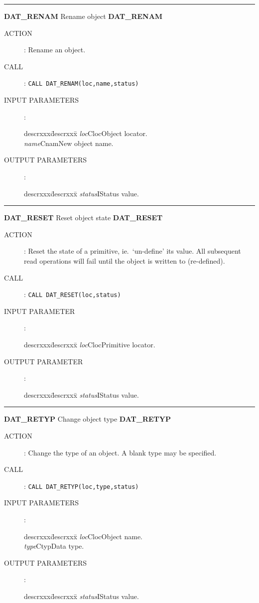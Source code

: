 \goodbreak
\rule{\textwidth}{0.3mm}
{\Large {\bf DAT\_RENAM} \hfill Rename object \hfill {\bf DAT\_RENAM}}
\begin{description}
\item [ACTION]:
Rename an object.
\item [CALL]:
{\tt CALL DAT\_RENAM(loc,name,status)}
\item [INPUT PARAMETERS]:
\begin{tabbing}
descrxxx\=descrxxx\=\kill
{\em loc}\>Cloc\>Object locator.\\
{\em name}\>Cnam\>New object name.
\end{tabbing}
\item [OUTPUT PARAMETERS]:
\begin{tabbing}
descrxxx\=descrxxx\=\kill
{\em status}\>I\>Status value.
\end{tabbing}
\end{description}
\goodbreak
\rule{\textwidth}{0.3mm}
{\Large {\bf DAT\_RESET} \hfill Reset object state \hfill {\bf DAT\_RESET}}
\begin{description}
\item [ACTION]:
Reset the state of a primitive, ie.\ `un-define' its value.
All subsequent read operations will fail until the object is written to
(re-defined).
\item [CALL]:
{\tt CALL DAT\_RESET(loc,status)}
\item [INPUT PARAMETER]:
\begin{tabbing}
descrxxx\=descrxxx\=\kill
{\em loc}\>Cloc\>Primitive locator.
\end{tabbing}
\item [OUTPUT PARAMETER]:
\begin{tabbing}
descrxxx\=descrxxx\=\kill
{\em status}\>I\>Status value.
\end{tabbing}
\end{description}
\goodbreak
\rule{\textwidth}{0.3mm}
{\Large {\bf DAT\_RETYP} \hfill Change object type \hfill {\bf DAT\_RETYP}}
\begin{description}
\item [ACTION]:
Change the type of an object.
A blank type may be specified.
\item [CALL]:
{\tt CALL DAT\_RETYP(loc,type,status)}
\item [INPUT PARAMETERS]:
\begin{tabbing}
descrxxx\=descrxxx\=\kill
{\em loc}\>Cloc\>Object name.\\
{\em type}\>Ctyp\>Data type.
\end{tabbing}
\item [OUTPUT PARAMETERS]:
\begin{tabbing}
descrxxx\=descrxxx\=\kill
{\em status}\>I\>Status value.
\end{tabbing}
\end{description}
